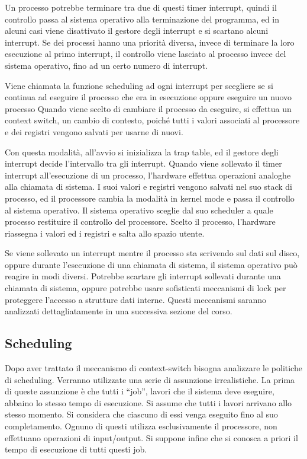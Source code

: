 \documentclass{article}
\numberwithin{equation}{subsection}
\begin{document}
Un processo potrebbe terminare tra due di questi timer interrupt, quindi il controllo passa al sistema operativo alla terminazione del programma, ed in alcuni casi 
viene disattivato il gestore degli interrupt e si scartano alcuni interrupt. Se dei processi hanno una priorità diversa, invece di terminare la loro esecuzione al primo 
interrupt, il controllo viene lasciato al processo invece del sistema operativo, fino ad un certo numero di interrupt. 

Viene chiamata la funzione scheduling ad ogni interrupt per scegliere se si continua ad eseguire il processo che era in esecuzione oppure eseguire un nuovo processo
Quando viene scelto di cambiare il processo da eseguire, si effettua un context switch, un cambio di contesto, poiché tutti i valori associati al processore e dei registri 
vengono salvati per usarne di nuovi. 



Con questa modalità, all'avvio si inizializza la trap table, ed il gestore degli interrupt decide l'intervallo tra gli interrupt. Quando viene sollevato il timer 
interrupt all'esecuzione di un processo, l'hardware effettua operazioni analoghe alla chiamata di sistema. I suoi valori e registri vengono salvati nel suo stack di 
processo, ed il processore cambia la modalità in kernel mode e passa il controllo al sistema operativo. Il sistema operativo sceglie dal suo scheduler a quale processo 
restituire il controllo del processore. Scelto il processo, l'hardware riassegna i valori ed i registri e salta allo spazio utente. 

Se viene sollevato un interrupt mentre il processo sta scrivendo sul dati sul disco, oppure durante l'esecuzione di una chiamata di sistema, il sistema operativo può reagire in modi 
diversi. Potrebbe scartare gli interrupt sollevati durante una chiamata di sistema, oppure potrebbe usare sofisticati meccanismi di lock per proteggere l'accesso a 
strutture dati interne. Questi meccanismi saranno analizzati dettagliatamente in una successiva sezione del corso. 

\subsection{Scheduling}

Dopo aver trattato il meccanismo di context-switch bisogna analizzare le politiche di scheduling. 
Verranno utilizzate una serie di assunzione irrealistiche. 
La prima di queste assunzione è che tutti i ``job'', lavori che il sistema deve eseguire, abbaino lo stesso tempo di esecuzione. Si assume che tutti i lavori arrivano 
allo stesso momento. Si considera che ciascuno di essi venga eseguito fino al suo completamento. Ognuno di questi utilizza esclusivamente il processore, non effettuano 
operazioni di input/output. Si suppone infine che si conosca a priori il tempo di esecuzione di tutti questi job. 
\end{document}
